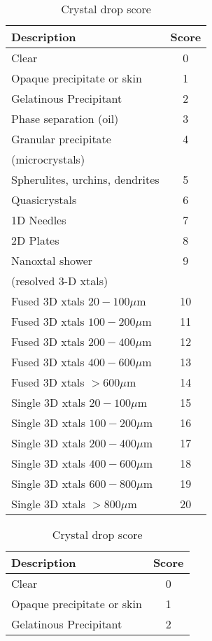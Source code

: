 \documentclass{report}
\begin{document}
\begin{table}[!htb]
	\begin{minipage}{.5\linewidth}
		\caption*{Crystal drop score}
		\centering
\begin{tabular}{l c}
	\toprule
	Description	& Score	 \\ 
	\midrule
	Clear & 0  \\ 
	Opaque precipitate or skin & 1  \\ 
	Gelatinous Precipitant & 2  \\ 
	Phase separation (oil) & 3  \\ 
	Granular precipitate & 4 \\
    (microcrystals) &   \\ 
	Spherulites, urchins, dendrites & 5  \\ 
    Quasicrystals & 6 \\
	1D Needles & 7  \\ 
	2D Plates & 8  \\ 
	Nanoxtal shower & 9 \\
    (resolved 3-D xtals) &   \\ 
	Fused 3D xtals $20 - 100 \mu$m & 10  \\
	Fused 3D xtals $100 - 200 \mu$m & 11  \\ 
	Fused 3D xtals $200 - 400 \mu$m & 12  \\
	Fused 3D xtals $400 - 600 \mu$m & 13  \\
	Fused 3D xtals $> 600 \mu$m & 14  \\
    Single 3D xtals $20 - 100 \mu$m & 15  \\
	Single 3D xtals $100 - 200 \mu$m & 16  \\
	Single 3D xtals $200 - 400 \mu$m & 17 \\
	Single 3D xtals $400 - 600\mu$m & 18 \\
	Single 3D xtals $600 - 800 \mu$m & 19  \\
    Single 3D xtals $> 800 \mu$m & 20  \\
	\bottomrule
\end{tabular} 
		\caption*{Crystal drop score}
\begin{tabular}{l c}
	\toprule
	Description	& Score	 \\ 
	\midrule
	Clear & 0  \\ 
	Opaque precipitate or skin & 1  \\ 
	Gelatinous Precipitant & 2  \\ 

\end{tabular}
\end{minipage}
\end{table}
\end{document}
